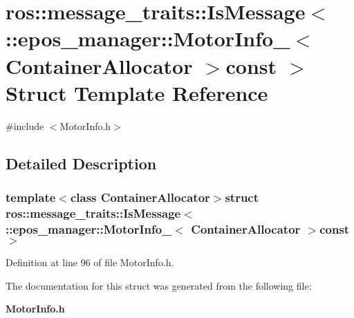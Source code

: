 \section{ros\-:\-:message\-\_\-traits\-:\-:\-Is\-Message$<$ \-:\-:epos\-\_\-manager\-:\-:\-Motor\-Info\-\_\-$<$ \-Container\-Allocator $>$const $>$ \-Struct \-Template \-Reference}
\label{structros_1_1message__traits_1_1IsMessage_3_01_1_1epos__manager_1_1MotorInfo___3_01ContainerAllocator_01_4const_01_01_4}


{\ttfamily \#include $<$\-Motor\-Info.\-h$>$}



\subsection{\-Detailed \-Description}
\subsubsection*{template$<$class Container\-Allocator$>$struct ros\-::message\-\_\-traits\-::\-Is\-Message$<$ \-::epos\-\_\-manager\-::\-Motor\-Info\-\_\-$<$ Container\-Allocator $>$const  $>$}



\-Definition at line 96 of file \-Motor\-Info.\-h.



\-The documentation for this struct was generated from the following file\-:\begin{DoxyCompactItemize}
\item 
{\bf \-Motor\-Info.\-h}\end{DoxyCompactItemize}
